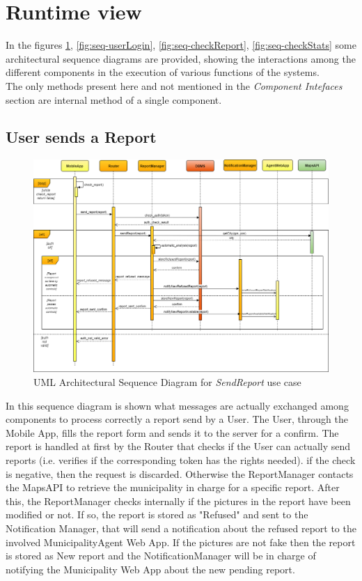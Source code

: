 \documentclass[a4paper]{report}
\begin{document}
\section{Runtime view}
In the figures \ref{fig:seq-sendReport}, \ref{fig:seq-userLogin}, \ref{fig:seq-checkReport}, \ref{fig:seq-checkStats} some architectural sequence diagrams are provided, showing the interactions among the different components in the execution of various functions of the systems. \\
The only methods present here and not mentioned in the \textit{Component Intefaces} section are internal method of a single component.
\subsection{User sends a Report}
\begin{landscape}

\begin{figure}[hp]
\includegraphics[angle=0, scale=0.70]{ArchSequenceSendReport}
\caption{UML Architectural Sequence Diagram for \textit{SendReport} use case}
\label{fig:seq-sendReport}
\end{figure}

\end{landscape}
\restoregeometry

In this sequence diagram is shown what messages are actually exchanged among components to process correctly a report send by a User. The User, through the Mobile App, fills the report form and sends it to the server for a confirm. The report is handled at first by the Router that checks if the User can actually send reports (i.e. verifies if the corresponding token has the rights needed). if the check is negative, then the request is discarded. Otherwise the ReportManager contacts the MapsAPI to retrieve the municipality in charge for a specific report. After this, the ReportManager checks internally if the pictures in the report have been modified or not. If so, the report is stored as "Refused" and sent to the Notification Manager, that will send a notification about the refused report to the involved MunicipalityAgent Web App. If the pictures are not fake then the report is stored as New report and the NotificationManager will be in charge of notifying the Municipality Web App about the new pending report.
  
\end{document}
